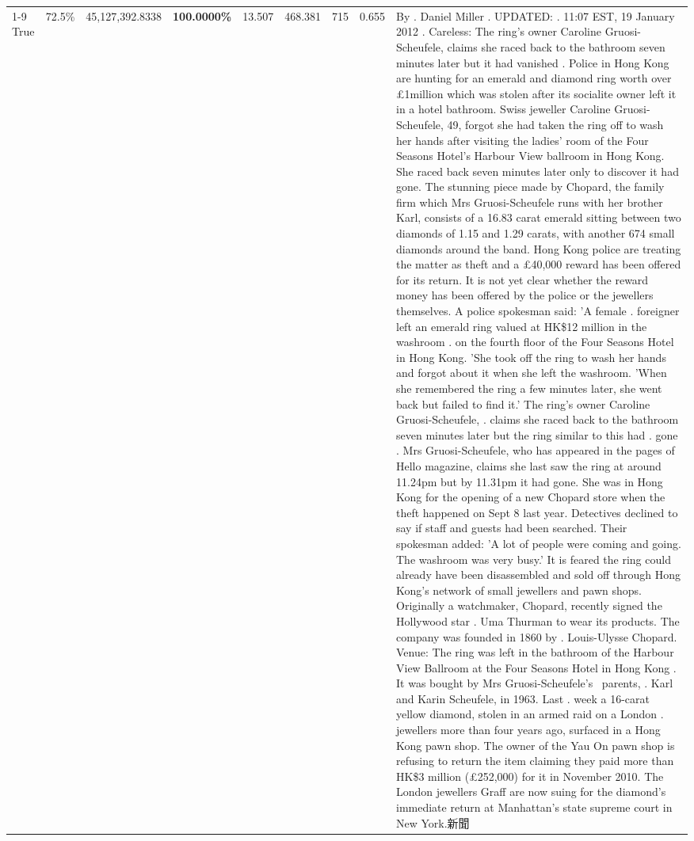 \begin{table}[H]
\begin{tabular}{lllrlllll}
\cline{1-9}
True & 72.5\% & 45,127,392.8338 & \bfseries \color{red} 100.0000\% & 13.507 & 468.381 & 715 & 0.655 & By . Daniel Miller . UPDATED: . 11:07 EST, 19 January 2012 . Careless: The ring's owner Caroline Gruosi-Scheufele, claims she raced back to the bathroom seven minutes later but it had vanished . Police in Hong Kong are hunting for an emerald and diamond ring worth over £1million which was stolen after its socialite owner left it in a hotel bathroom. Swiss jeweller Caroline Gruosi-Scheufele, 49, forgot she had taken the ring off to wash her hands after visiting the ladies' room of the Four Seasons Hotel's Harbour View ballroom in Hong Kong. She raced back seven minutes later only to discover it had gone. The stunning piece made by Chopard, the family firm which Mrs Gruosi-Scheufele runs with her brother Karl, consists of a 16.83 carat emerald sitting between two diamonds of 1.15 and 1.29 carats, with another 674 small diamonds around the band. Hong Kong police are treating the matter as theft and a £40,000 reward has been offered for its return. It is not yet clear whether the reward money has been offered by the police or the jewellers themselves. A police spokesman said: 'A female . foreigner left an emerald ring valued at HK\$12 million in the washroom . on the fourth floor of the Four Seasons Hotel in Hong Kong. 'She took off the ring to wash her hands and forgot about it when she left the washroom. 'When she remembered the ring a few minutes later, she went back but failed to find it.' The ring's owner Caroline Gruosi-Scheufele, . claims she raced back to the bathroom seven minutes later but the ring similar to this had . gone . Mrs Gruosi-Scheufele, who has appeared in the pages of Hello magazine, claims she last saw the ring at around 11.24pm but by 11.31pm it had gone. She was in Hong Kong for the opening of a new Chopard store when the theft happened on Sept 8 last year. Detectives declined to say if staff and guests had been searched. Their spokesman added: 'A lot of people were coming and going. The washroom was very busy.' It is feared the ring could already have been disassembled and sold off through Hong Kong's network of small jewellers and pawn shops. Originally a watchmaker, Chopard, recently signed the Hollywood star . Uma Thurman to wear its products. The company was founded in 1860 by . Louis-Ulysse Chopard. Venue: The ring was left in the bathroom of the Harbour View Ballroom at the Four Seasons Hotel in Hong Kong . It was bought by Mrs Gruosi-Scheufele's  parents, . Karl and Karin Scheufele, in 1963. Last . week a 16-carat yellow diamond, stolen in an armed raid on a London . jewellers more than four years ago, surfaced in a Hong Kong pawn shop. The owner of the Yau On pawn shop is refusing to return the item claiming they paid more than HK\$3 million (£252,000) for it in November 2010. The London jewellers Graff are now suing for the diamond’s immediate return at Manhattan’s state supreme court in New York.新聞 \\

\end{tabular}
\end{table}
